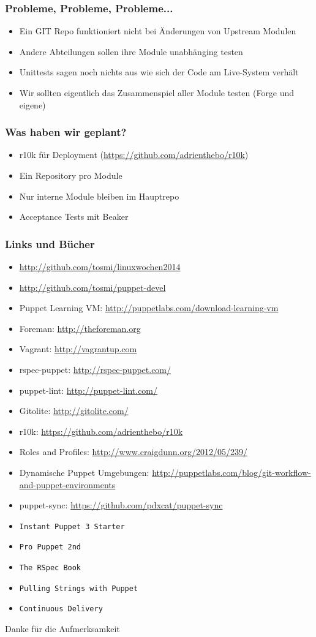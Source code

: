 \documentclass{beamer}
\begin{document}
\begin{frame}
  \frametitle{Probleme, Probleme, Probleme...}

  \begin{itemize}
  \item Ein GIT Repo funktioniert nicht bei Änderungen von Upstream Modulen
  \item Andere Abteilungen sollen ihre Module unabhänging testen
  \item Unittests sagen noch nichts aus wie sich der Code am Live-System verhält
  \item Wir sollten eigentlich das Zusammenspiel aller Module testen (Forge und eigene)
  \end{itemize}
\end{frame}

\begin{frame}
  \frametitle{Was haben wir geplant?}

  \begin{itemize}
  \item r10k für Deployment (\url{https://github.com/adrienthebo/r10k})
  \item Ein Repository pro Module
  \item Nur interne Module bleiben im Hauptrepo
  \item Acceptance Tests mit Beaker
  \end{itemize}
\end{frame}

\begin{frame}
  \frametitle{Links und Bücher}
\tiny
  \begin{itemize}
  \item \url{http://github.com/tosmi/linuxwochen2014}
  \item \url{http://github.com/tosmi/puppet-devel}
  \item Puppet Learning VM: \url{http://puppetlabs.com/download-learning-vm}
  \item Foreman: \url{http://theforeman.org}
  \item Vagrant: \url{http://vagrantup.com}
  \item rspec-puppet: \url{http://rspec-puppet.com/}
  \item puppet-lint: \url{http://puppet-lint.com/}
  \item Gitolite: \url {http://gitolite.com/}
  \item r10k: \url{https://github.com/adrienthebo/r10k}
  \item Roles and Profiles: \url{http://www.craigdunn.org/2012/05/239/}
  \item Dynamische Puppet Umgebungen: \url{http://puppetlabs.com/blog/git-workflow-and-puppet-environments}
  \item puppet-sync: \url{https://github.com/pdxcat/puppet-sync}
  \item \texttt{Instant Puppet 3 Starter}
  \item \texttt{Pro Puppet 2nd}
  \item \texttt{The RSpec Book}
  \item \texttt{Pulling Strings with Puppet}
  \item \texttt{Continuous Delivery}
  \end{itemize}
\end{frame}

\begin{frame}
  \huge{Danke für die Aufmerksamkeit}
\end{frame}
\end{document}
